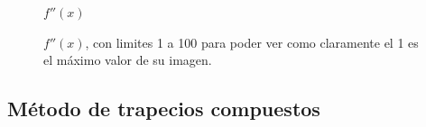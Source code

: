 \documentclass[11pt,a4paper]{article}
\begin{document}
\begin{figure}[H]
	\caption{\(f''(x)\)}
	\label{fig:funcionderivada2}
\end{figure}


\begin{figure}[H]
	\caption{\(f''(x)\), con limites 1 a 100 para poder ver como claramente el 1 es el máximo valor de su imagen.}
	\label{fig:funcionderivada2zoom}
\end{figure}

\subsection{Método de trapecios compuestos}
\end{document}
